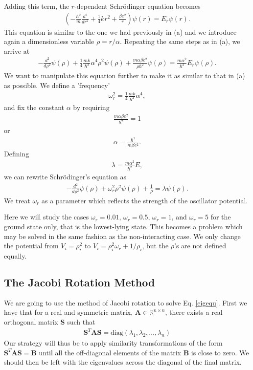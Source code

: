 \documentclass[11pt, a4paper]{article}
\begin{document}
Adding this term, the $r$-dependent Schr\"odinger equation becomes
\begin{gather}
\left(  -\frac{\hbar^2}{m} \frac{d^2}{dr^2}+ \frac{1}{4}k r^2+\frac{\beta e^2}{r}\right)\psi(r)  = E_r \psi(r).
\end{gather}
This equation is similar to the one we had previously in (a) and we introduce
again a dimensionless variable $\rho = r/\alpha$. Repeating the same
steps as in (a), we arrive at 
\begin{gather}
  -\frac{d^2}{d\rho^2} \psi(\rho) 
       + \frac{1}{4}\frac{mk}{\hbar^2} \alpha^4\rho^2\psi(\rho)+\frac{m\alpha \beta e^2}{\rho\hbar^2}\psi(\rho)  = 
\frac{m\alpha^2}{\hbar^2}E_r \psi(\rho) .
\end{gather}
We want to manipulate this equation further to make it as similar to that in (a)
as possible. We define a 'frequency' 
\begin{gather}
\omega_r^2=\frac{1}{4}\frac{mk}{\hbar^2} \alpha^4,
\end{gather}
and fix the constant $\alpha$ by requiring 
\begin{gather}
\frac{m\alpha \beta e^2}{\hbar^2}=1
\end{gather}
or 
\begin{gather}
\alpha = \frac{\hbar^2}{m\beta e^2}.
\end{gather}
Defining 
\begin{gather}
\lambda = \frac{m\alpha^2}{\hbar^2}E,
\end{gather}
we can rewrite Schr\"odinger's equation as
\begin{gather}
  -\frac{d^2}{d\rho^2} \psi(\rho) + \omega_r^2\rho^2\psi(\rho) +\frac{1}{\rho} = \lambda \psi(\rho).
\end{gather}
We treat $\omega_r$ as a parameter which reflects the strength of the oscillator potential.

Here we will study the cases $\omega_r = 0.01$, $\omega_r = 0.5$, $\omega_r =1$,
and $\omega_r = 5$   
for the ground state only, that is the lowest-lying state. This becomes a problem which may be solved in the same fashion as the non-interacting case. We only change the potential from $V_i = \rho_i^2$ to $V_i = \rho_i^2\omega_r + 1/\rho_i$, but the $\rho$'s are not defined equally.

\subsection{The Jacobi Rotation Method}

We are going to use the method of Jacobi rotation to solve Eq. \eqref{eigequ}. First we have that for a real and symmetric matrix, $\mathbf{A} \in \mathbb{R}^{n\times n}$, there exists a real orthogonal matrix $\mathbf{S}$ such that
\begin{gather}
\mathbf{S}^T\mathbf{AS} = \text{diag}(\lambda_1, \lambda_2, \dots, \lambda_n)
\label{eq:symtrans}
\end{gather}
Our strategy will thus be to apply similarity transformations of the form $\mathbf{S}^T\mathbf{AS} = \mathbf{B}$ until all the off-diagonal elements of the matrix $\mathbf{B}$ is close to zero. We should then be left with the eigenvalues across the diagonal of the final matrix.
\end{document}
